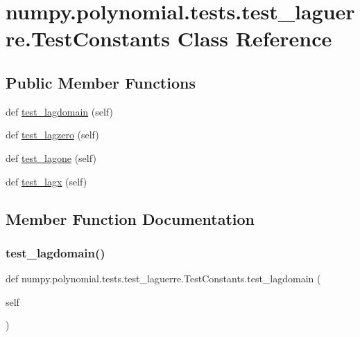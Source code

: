\hypertarget{classnumpy_1_1polynomial_1_1tests_1_1test__laguerre_1_1TestConstants}{}\section{numpy.\+polynomial.\+tests.\+test\+\_\+laguerre.\+Test\+Constants Class Reference}
\label{classnumpy_1_1polynomial_1_1tests_1_1test__laguerre_1_1TestConstants}
\subsection*{Public Member Functions}
\begin{DoxyCompactItemize}
\item 
def \hyperlink{classnumpy_1_1polynomial_1_1tests_1_1test__laguerre_1_1TestConstants_a93b9876e780d1dd87673cba00b78c284}{test\+\_\+lagdomain} (self)
\item 
def \hyperlink{classnumpy_1_1polynomial_1_1tests_1_1test__laguerre_1_1TestConstants_ab2bff44f0a0feb614b9fdccb5cd21b97}{test\+\_\+lagzero} (self)
\item 
def \hyperlink{classnumpy_1_1polynomial_1_1tests_1_1test__laguerre_1_1TestConstants_ad3d379dfd5409c71ddb69a95ef782fb3}{test\+\_\+lagone} (self)
\item 
def \hyperlink{classnumpy_1_1polynomial_1_1tests_1_1test__laguerre_1_1TestConstants_a51e402183d7edf81a4b831f2e6a6b5ab}{test\+\_\+lagx} (self)
\end{DoxyCompactItemize}


\subsection{Member Function Documentation}
\mbox{\label{classnumpy_1_1polynomial_1_1tests_1_1test__laguerre_1_1TestConstants_a93b9876e780d1dd87673cba00b78c284}} 
\subsubsection{\texorpdfstring{test\+\_\+lagdomain()}{test\_lagdomain()}}
{\footnotesize\ttfamily def numpy.\+polynomial.\+tests.\+test\+\_\+laguerre.\+Test\+Constants.\+test\+\_\+lagdomain (\begin{DoxyParamCaption}\item[{}]{self }\end{DoxyParamCaption})}

